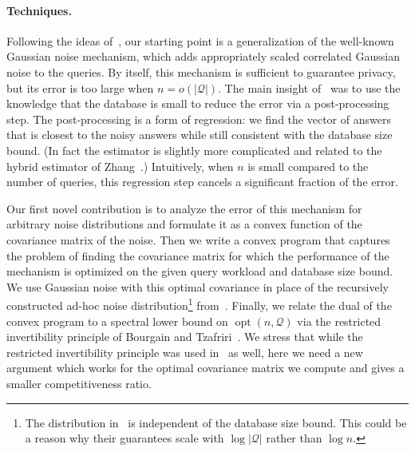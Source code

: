 \documentclass{article}
\newcommand\junk[1]{}
\DeclareMathOperator{\opt}{opt}
\newcommand{\quer}{\mathcal{Q}}
\begin{document}
\junk{Another
interesting problem is to remove the dependence on the universe size
in the competitiveness ratio. It is plausible that this can be done
with the projection mechanism and a well-chosen Gaussian noise
distribution, but we would need tighter lower bounds, possibly based
on fingerprinting codes as in~\cite{BunUV13}.}






\paragraph{Techniques.}
Following the ideas of~\cite{NTZ}, our starting point is a
generalization of the well-known Gaussian noise mechanism, which adds
appropriately scaled correlated Gaussian noise to the queries. By
itself, this mechanism is sufficient to guarantee privacy, but its
error is too large when $n = o(|\quer|)$. The main insight
of~\cite{NTZ} was to use the knowledge that the database is small to
reduce the error via a post-processing step. The post-processing is a
form of regression: we find the vector of answers that is closest to the
noisy answers while still consistent with the database size bound.
(In fact the estimator is slightly more complicated and related to the
hybrid estimator of Zhang~\cite{Zhang13-hybrid}.)  Intuitively, when
$n$ is small compared to the number of queries, this regression step
cancels a significant fraction of the error.

Our first novel contribution is to analyze the error of this mechanism
for arbitrary noise distributions and formulate it as a convex
function of the covariance matrix of the noise. Then we write a convex
program that captures the problem of finding the covariance matrix for
which the performance of the mechanism is optimized on the given query
workload and database size bound. We use Gaussian noise with this
optimal covariance in place of the recursively constructed ad-hoc
noise distribution\footnote{The distribution in~\cite{NTZ} is
  independent of the database size bound. This could be a reason why
  their guarantees scale with $\log |\quer|$ rather than $\log n$.}
from~\cite{NTZ}. Finally, we relate the dual of the convex program to
a spectral lower bound on $\opt(n, \quer)$ via the restricted
invertibility principle of Bourgain and Tzafriri~\cite{bour-tza}. We
stress that while the restricted invertibility principle was used
in~\cite{NTZ} as well, here we need a new argument which works for the
optimal covariance matrix we compute and gives a smaller
competitiveness ratio.
\end{document}
